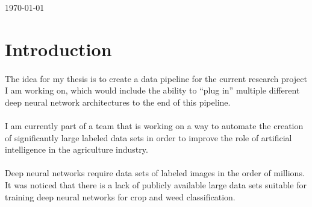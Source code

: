 \documentclass[12pt]{article}
\begin{document}
\begin{titlepage}
	
	
	\vfill\vfill\vfill %
	
	{\large\today} %
	
	
	
	
	\vfill %
	
\end{titlepage}

	\section{Introduction}
		\paragraph{}
			The idea for my thesis is to create a data pipeline for the current research project I am working on, which would include the ability to \enquote{plug in} multiple different deep neural network architectures to the end of this pipeline.
			
		\paragraph{}
			I am currently part of a team that is working on a way to automate the creation of significantly large labeled data sets in order to improve the role of artificial intelligence in the agriculture industry.
			
		\paragraph{}
			Deep neural networks require data sets of labeled images in the order of millions.  It was noticed that there is a lack of publicly available large data sets suitable for training deep neural networks for crop and weed classification.
	
\end{document}
